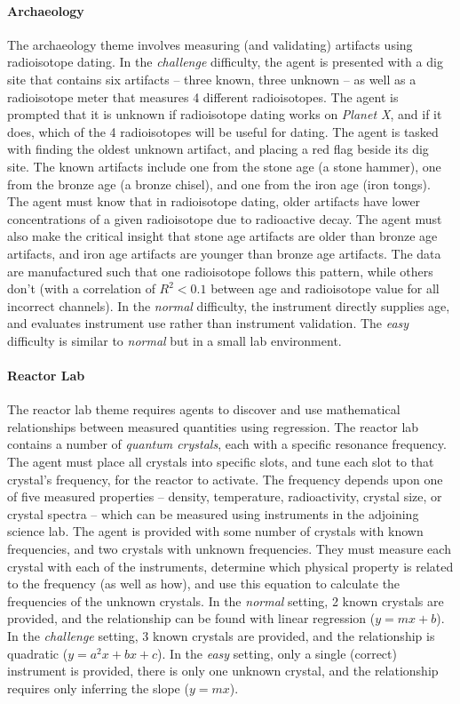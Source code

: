 \paragraph{Archaeology} The archaeology theme involves measuring (and validating) artifacts using radioisotope dating.  In the \textit{challenge} difficulty, the agent is presented with a dig site that contains six artifacts -- three known, three unknown -- as well as a radioisotope meter that measures 4 different radioisotopes.  The agent is prompted that it is unknown if radioisotope dating works on \textit{Planet X}, and if it does, which of the 4 radioisotopes will be useful for dating.  The agent is tasked with finding the oldest unknown artifact, and placing a red flag beside its dig site.  The known artifacts include one from the stone age (a stone hammer), one from the bronze age (a bronze chisel), and one from the iron age (iron tongs).  The agent must know that in radioisotope dating, older artifacts have lower concentrations of a given radioisotope due to radioactive decay.  The agent must also make the critical insight that stone age artifacts are older than bronze age artifacts, and iron age artifacts are younger than bronze age artifacts.  The data are manufactured such that one radioisotope follows this pattern, while others don't (with a correlation of $R^{2} < 0.1$ between age and radioisotope value for all incorrect channels).  In the \textit{normal} difficulty, the instrument directly supplies age, and evaluates instrument use rather than instrument validation.  The \textit{easy} difficulty is similar to \textit{normal} but in a small lab environment.

\paragraph{Reactor Lab} The reactor lab theme requires agents to discover and use mathematical relationships between measured quantities using regression.  The reactor lab contains a number of \textit{quantum crystals}, each with a specific resonance frequency.  The agent must place all crystals into specific slots, and tune each slot to that crystal's frequency, for the reactor to activate.  The frequency depends upon one of five measured properties -- density, temperature, radioactivity, crystal size, or crystal spectra -- which can be measured using instruments in the adjoining science lab.  The agent is provided with some number of crystals with known frequencies, and two crystals with unknown frequencies.  They must measure each crystal with each of the instruments, determine which physical property is related to the frequency (as well as how), and use this equation to calculate the frequencies of the unknown crystals.  In the \textit{normal} setting, 2 known crystals are provided, and the relationship can be found with linear regression ($y=mx+b$).  In the \textit{challenge} setting, 3 known crystals are provided, and the relationship is quadratic ($y=a^2x+bx+c$).  In the \textit{easy} setting, only a single (correct) instrument is provided, there is only one unknown crystal, and the relationship requires only inferring the slope ($y=mx$).

